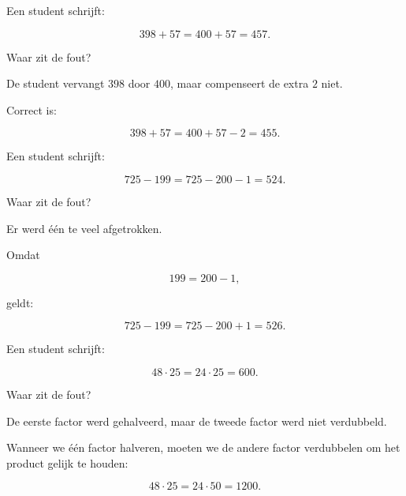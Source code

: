\documentclass{ximera}
\begin{document}
\begin{oefening}{\oefU\ESS}

\begin{question}

Een student schrijft:

\[
398+57
=
400+57
=
457.
\]

Waar zit de fout?

\begin{oplossing}

De student vervangt \(398\) door \(400\), maar compenseert de extra \(2\)
niet.

Correct is:

\[
398+57
=
400+57-2
=
455.
\]

\end{oplossing}

\end{question}


\begin{question}

Een student schrijft:

\[
725-199
=
725-200-1
=
524.
\]

Waar zit de fout?

\begin{oplossing}

Er werd één te veel afgetrokken.

Omdat

\[
199=200-1,
\]

geldt:

\[
725-199
=
725-200+1
=
526.
\]

\end{oplossing}

\end{question}


\begin{question}

Een student schrijft:

\[
48\cdot25
=
24\cdot25
=
600.
\]

Waar zit de fout?

\begin{oplossing}

De eerste factor werd gehalveerd, maar de tweede factor werd niet
verdubbeld.

Wanneer we één factor halveren, moeten we de andere factor verdubbelen om
het product gelijk te houden:

\[
48\cdot25
=
24\cdot50
=
1200.
\]

\end{oplossing}


\end{question}
\end{oefening}
\end{document}
